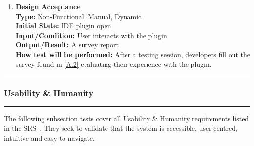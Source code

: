 \documentclass[12pt, titlepage]{article}
\newcommand{\colorrule}{\textcolor{BlueViolet}{\rule{\linewidth}{2pt}}}
\begin{document}
\begin{enumerate}[label={\bf \textcolor{Maroon}{test-LF-\arabic*}}, wide=0pt, font=\itshape]
  \item \textbf{Design Acceptance} \\[2mm]
    \textbf{Type:} Non-Functional, Manual, Dynamic \\
    \textbf{Initial State:} IDE plugin open \\
    \textbf{Input/Condition:} User interacts with the plugin \\
    \textbf{Output/Result:} A survey report \\[2mm]
    \textbf{How test will be performed:} After a testing session, developers fill out the survey found in \ref{A.2} evaluating their experience with the plugin.
\end{enumerate}

\noindent
\colorrule
    
\subsubsection{Usability \& Humanity}

\colorrule

\medskip

\noindent
The following subsection tests cover all Usability \& Humanity requirements listed in the SRS~\cite{SRS}. They seek to validate that the system is accessible, user-centred, intuitive and easy to navigate.
\end{document}
